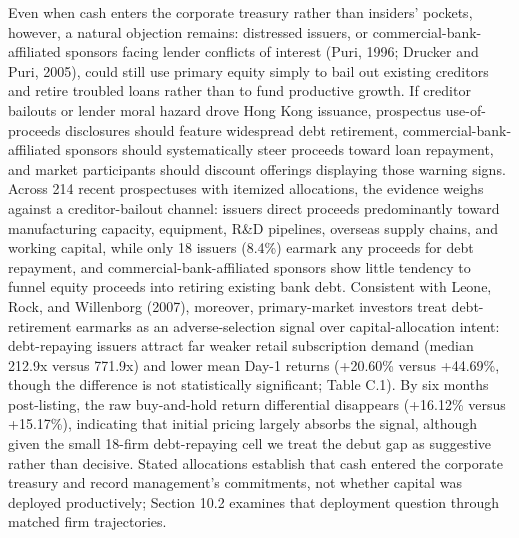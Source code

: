 \documentclass[11pt,letterpaper]{article}
\begin{document}
Even when cash enters the corporate treasury rather than insiders' pockets, however, a natural objection remains: distressed issuers, or commercial-bank-affiliated sponsors facing lender conflicts of interest (Puri, 1996; Drucker and Puri, 2005), could still use primary equity simply to bail out existing creditors and retire troubled loans rather than to fund productive growth. If creditor bailouts or lender moral hazard drove Hong Kong issuance, prospectus use-of-proceeds disclosures should feature widespread debt retirement, commercial-bank-affiliated sponsors should systematically steer proceeds toward loan repayment, and market participants should discount offerings displaying those warning signs. Across 214 recent prospectuses with itemized allocations, the evidence weighs against a creditor-bailout channel: issuers direct proceeds predominantly toward manufacturing capacity, equipment, R\&D pipelines, overseas supply chains, and working capital, while only 18 issuers (8.4\%) earmark any proceeds for debt repayment, and commercial-bank-affiliated sponsors show little tendency to funnel equity proceeds into retiring existing bank debt. Consistent with Leone, Rock, and Willenborg (2007), moreover, primary-market investors treat debt-retirement earmarks as an adverse-selection signal over capital-allocation intent: debt-repaying issuers attract far weaker retail subscription demand (median 212.9x versus 771.9x) and lower mean Day-1 returns (+20.60\% versus +44.69\%, though the difference is not statistically significant; Table C.1). By six months post-listing, the raw buy-and-hold return differential disappears (+16.12\% versus +15.17\%), indicating that initial pricing largely absorbs the signal, although given the small 18-firm debt-repaying cell we treat the debut gap as suggestive rather than decisive. Stated allocations establish that cash entered the corporate treasury and record management's commitments, not whether capital was deployed productively; Section 10.2 examines that deployment question through matched firm trajectories.
\end{document}
